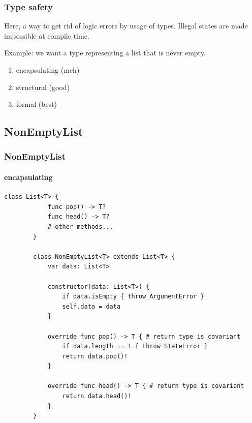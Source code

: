 \documentclass[compress,12pt,xcolor={dvipsnames}]{beamer}
\begin{document}
\begin{frame}
    \frametitle{Type safety}
    Here, a way to get rid of logic errors by usage of types. Illegal states are made impossible at compile time.

    Example: we want a type representing a list that is never empty.
    \begin{enumerate}
        \item encapsulating (meh)
        \item structural (good)
        \item formal (best)
    \end{enumerate}
\end{frame}

\subsection{NonEmptyList}

\begin{frame}[fragile]
    \frametitle{NonEmptyList}
    \framesubtitle{encapsulating}
    \begin{lstlisting}[language=Oop,gobble=8,basicstyle=\tt\scriptsize]
        class List<T> {
            func pop() -> T?
            func head() -> T?
            # other methods...
        }

        class NonEmptyList<T> extends List<T> {
            var data: List<T>

            constructor(data: List<T>) {
                if data.isEmpty { throw ArgumentError }
                self.data = data
            }

            override func pop() -> T { # return type is covariant
                if data.length == 1 { throw StateError }
                return data.pop()!
            }

            override func head() -> T { # return type is covariant
                return data.head()!
            }
        }
    \end{lstlisting}
\end{frame}
\end{document}

